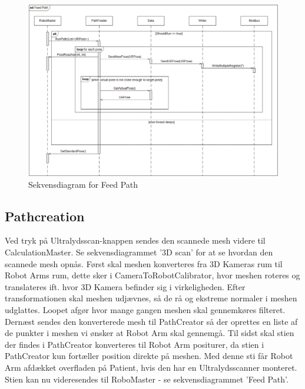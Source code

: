 \begin{figure}[H]
    \centering
    \includegraphics[width=1\textwidth]{figurer/d/Design/Sequence/sd_feedpath}
    \caption{Sekvensdiagram for Feed Path}
    \label{sd_feedpath}
\end{figure}

\subsection{Pathcreation}
Ved tryk på Ultralydsscan-knappen sendes den scannede mesh videre til CalculationMaster. Se sekvensdiagrammet '3D scan' for at se hvordan den scannede mesh opnås.
Først skal meshen konverteres fra 3D Kameras rum til Robot Arms rum, dette sker i CameraToRobotCalibrator, hvor meshen roteres og translateres ift. hvor 3D Kamera befinder sig i virkeligheden.
Efter transformationen skal meshen udjævnes, så de rå og ekstreme normaler i meshen udglattes. Loopet afgør hvor mange gangen meshen skal gennemkøres filteret.
Dernæst sendes den konverterede mesh til PathCreator så der oprettes en liste af de punkter i meshen vi ønsker at Robot Arm skal gennemgå.
Til sidst skal stien der findes i PathCreator konverteres til Robot Arm positurer, da stien i PathCreator kun fortæller position direkte på meshen.
Med denne sti får Robot Arm afdækket overfladen på Patient, hvis den har en Ultralydsscanner monteret.
Stien kan nu videresendes til RoboMaster - se sekvensdiagrammet 'Feed Path'.

